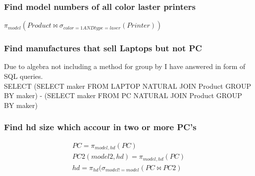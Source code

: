 \documentclass[12pt, a4paper]{article}
\begin{document}
				\subsubsection{Find model numbers of all color laster printers}
					$\pi_{model}(Product \bowtie \sigma_{color = 1 AND type = laser}(Printer))$
				\subsubsection{Find manufactures that sell Laptops but not PC}
					Due to algebra not including a method for group by I have answered in form of SQL queries.\\
					SELECT (SELECT maker FROM LAPTOP NATURAL JOIN Product GROUP BY maker)  -  (SELECT maker FROM PC NATURAL JOIN Product GROUP BY maker)
				\subsubsection{Find hd size which accour in two or more PC's}
					\begin{align*}
						PC = \pi_{model,hd}(PC)\\
						PC2(model2,hd) = \pi_{model,hd}(PC)\\
						hd = \pi_{hd}(\sigma_{model != model}(PC \bowtie PC2)
					\end{align*}
			\clearpage
\end{document}
